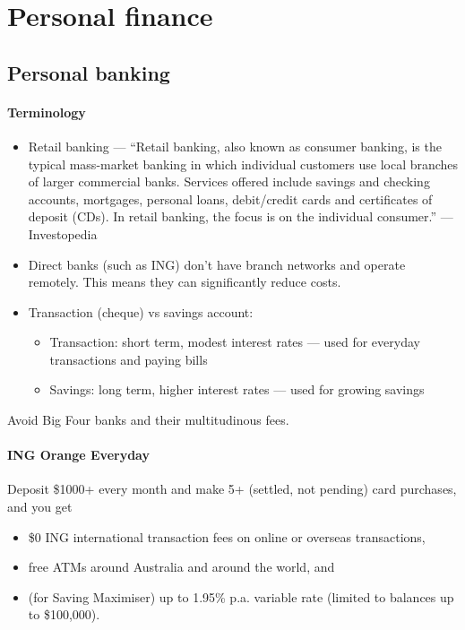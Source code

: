 \chapter{Personal finance}

\section{Personal banking}

\subsubsection{Terminology}
\begin{itemize}
	\item Retail banking --- ``Retail banking, also known as consumer banking, is the typical mass-market banking in which individual customers use local branches of larger commercial banks. Services offered include savings and checking accounts, mortgages, personal loans, debit/credit cards and certificates of deposit (CDs). In retail banking, the focus is on the individual consumer.'' --- Investopedia \cite{investopedia_retail_banking}
	\item Direct banks (such as ING) don't have branch networks and operate remotely. This means they can significantly reduce costs.
	\item Transaction (cheque) vs savings account:
	\begin{itemize}
		\item Transaction: short term, modest interest rates --- used for everyday transactions and paying bills
		\item Savings: long term, higher interest rates --- used for growing savings
	\end{itemize}
\end{itemize}

Avoid Big Four banks and their multitudinous fees.

\subsubsection{ING Orange Everyday}
Deposit \$1000+ every month and make 5+ (settled, not pending) card purchases, and you get
\begin{itemize}
	\item \$0 ING international transaction fees on online or overseas transactions,
	\item free ATMs around Australia and around the world, and
	\item (for Saving Maximiser) up to 1.95\% p.a. variable rate (limited to balances up to \$100,000).
\end{itemize}

